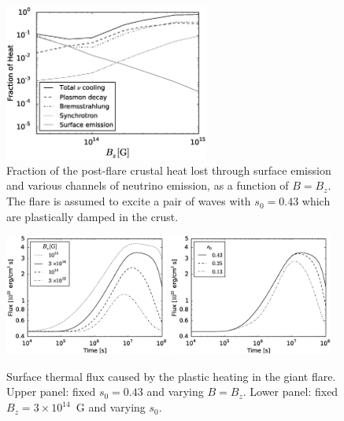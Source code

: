 \begin{figure}[htbp]
\centering
\includegraphics[width=0.6\textwidth]{pics/chap3/fig9.eps} 
\caption[Fraction of the post-flare crustal heat lost through surface emission and various channels of neutrino emission]{Fraction of the post-flare crustal heat lost through surface emission and various channels of neutrino emission, as a function of $B=B_z$. The flare is assumed to excite a pair of \alfven waves with $s_0=0.43$ which are plastically damped in the crust.}
\label{fig9}
\end{figure}

\begin{figure}[htbp]
\centering
\includegraphics[width=0.48\textwidth]{pics/chap3/fig10_1.eps}
\includegraphics[width=0.48\textwidth]{pics/chap3/fig10_2.eps} 
\caption[Surface thermal flux caused by the plastic heating in the giant flare]{Surface thermal flux caused by the plastic heating in the giant flare. 
Upper panel: fixed $s_0=0.43$ and varying $B=B_z$.
Lower panel: fixed $B_z=3\times 10^{14}$~G and varying $s_0$.}
\label{fig10}
\end{figure}

